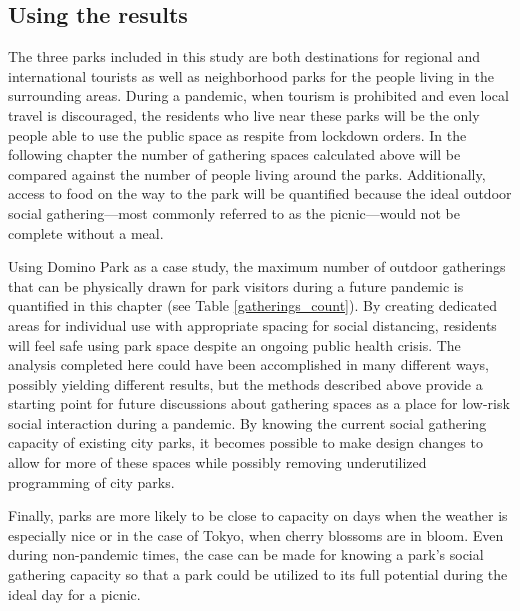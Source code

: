 \begin{multicols}{2}

\subsection{Using the results}
The three parks included in this study are both destinations for regional and international tourists as well as neighborhood parks for the people living in the surrounding areas. During a pandemic, when tourism is prohibited and even local travel is discouraged, the residents who live near these parks will be the only people able to use the public space as respite from lockdown orders. In the following chapter the number of gathering spaces calculated above will be compared against the number of people living around the parks. Additionally, access to food on the way to the park will be quantified because the ideal outdoor social gathering---most commonly referred to as the picnic---would not be complete without a meal. 

Using Domino Park as a case study, the maximum number of outdoor gatherings that can be physically drawn for park visitors during a future pandemic is quantified in this chapter (see Table \ref{gatherings_count}). By creating dedicated areas for individual use with appropriate spacing for social distancing, residents will feel safe using park space despite an ongoing public health crisis. The analysis completed here could have been accomplished in many different ways, possibly yielding different results, but the methods described above provide a starting point for future discussions about gathering spaces as a place for low-risk social interaction during a pandemic. By knowing the current social gathering capacity of existing city parks, it becomes possible to make design changes to allow for more of these spaces while possibly removing underutilized programming of city parks. 

Finally, parks are more likely to be close to capacity on days when the weather is especially nice or in the case of Tokyo, when cherry blossoms are in bloom. Even during non-pandemic times, the case can be made for knowing a park's social gathering capacity so that a park could be utilized to its full potential during the ideal day for a picnic.
\end{multicols}